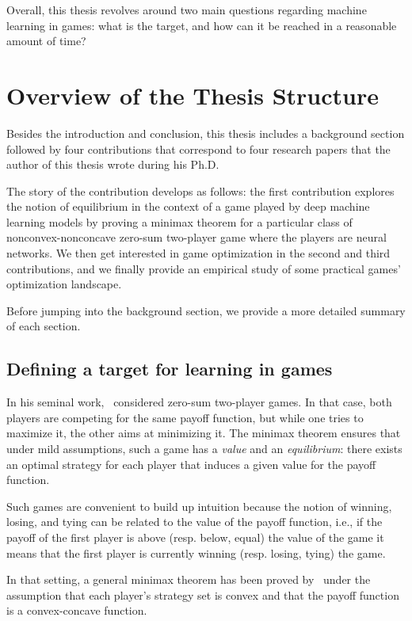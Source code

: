 Overall, this thesis revolves around two main questions regarding machine learning in games: what is the target, and how can it be reached in a reasonable amount of time?


\section{Overview of the Thesis Structure}

Besides the introduction and conclusion, this thesis includes a background section followed by four contributions that correspond to four research papers that the author of this thesis wrote during his Ph.D.

The story of the contribution develops as follows: the first contribution explores the notion of equilibrium in the context of a game played by deep machine learning models by proving a minimax theorem for a particular class of nonconvex-nonconcave zero-sum two-player game where the players are neural networks. We then get interested in game optimization in the second and third contributions, and we finally provide an empirical study of some practical games' optimization landscape. 

Before jumping into the background section, we provide a more detailed summary of each section.

\subsection{Defining a target for learning in games}

In his seminal work,~\citet{neumann1928theorie} considered zero-sum two-player games. In that case, both players are competing for the same payoff function, but while one tries to maximize it, the other aims at minimizing it. The minimax theorem ensures that under mild assumptions, such a game has a \emph{value} and an \emph{equilibrium}: there exists an optimal strategy for each player that induces a given value for the payoff function.

Such games are convenient to build up intuition because the notion of winning, losing, and tying can be related to the value of the payoff function, i.e., if the payoff of the first player is above (resp. below, equal) the value of the game it means that the first player is currently winning (resp. losing, tying) the game. 

In that setting, a general minimax theorem has been proved by~\citet{sion1958general} under the assumption that each player’s strategy set is convex and that the payoff function is a convex-concave function. 

